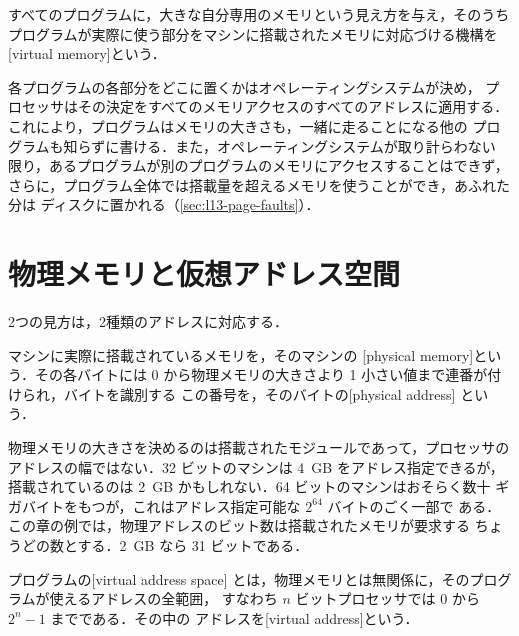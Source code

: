 \documentclass[../main.tex]{subfiles}
\begin{document}
\begin{definition}[仮想記憶]
  すべてのプログラムに，大きな自分専用のメモリという見え方を与え，そのうち
  プログラムが実際に使う部分をマシンに搭載されたメモリに対応づける機構を
  [virtual memory]という．
\end{definition}

各プログラムの各部分をどこに置くかはオペレーティングシステムが決め，
プロセッサはその決定をすべてのメモリアクセスのすべてのアドレスに適用する．
これにより，プログラムはメモリの大きさも，一緒に走ることになる他の
プログラムも知らずに書ける．また，オペレーティングシステムが取り計らわない
限り，あるプログラムが別のプログラムのメモリにアクセスすることはできず，
さらに，プログラム全体では搭載量を超えるメモリを使うことができ，あふれた分は
ディスクに置かれる（\cref{sec:l13-page-faults}）．

\section{物理メモリと仮想アドレス空間}
\label{sec:l13-views}

2つの見方は，2種類のアドレスに対応する．

\begin{definition}[物理メモリ]
  マシンに実際に搭載されているメモリを，そのマシンの
  [physical memory]という．その各バイトには
  0 から物理メモリの大きさより 1 小さい値まで連番が付けられ，バイトを識別する
  この番号を，そのバイトの[physical address]%
  という．
\end{definition}

物理メモリの大きさを決めるのは搭載されたモジュールであって，プロセッサの
アドレスの幅ではない．32 ビットのマシンは 4~GB をアドレス指定できるが，
搭載されているのは 2~GB かもしれない．64 ビットのマシンはおそらく数十
ギガバイトをもつが，これはアドレス指定可能な $2^{64}$ バイトのごく一部で
ある．この章の例では，物理アドレスのビット数は搭載されたメモリが要求する
ちょうどの数とする．2~GB なら 31 ビットである．

\begin{definition}[仮想アドレス空間]
  プログラムの[virtual address space]%
  とは，物理メモリとは無関係に，そのプログラムが使えるアドレスの全範囲，
  すなわち $n$ ビットプロセッサでは 0 から $2^{n}-1$ までである．その中の
  アドレスを[virtual address]という．
\end{definition}
\end{document}

